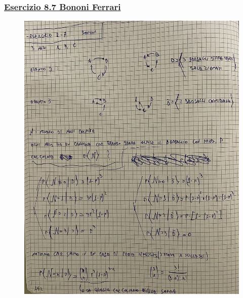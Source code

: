 \documentclass{article}
\begin{document}
\subsubsection{\underline{Esercizio 8.7 Bononi Ferrari}}
\begin{figure}[H]
\centering
\includegraphics[scale=0.10]{ese/39.jpeg}
\end{figure}
\end{document}

